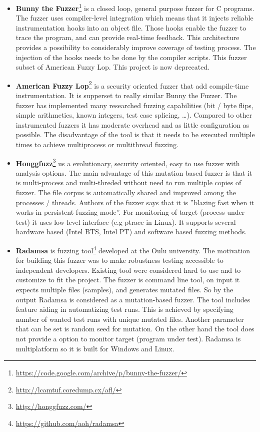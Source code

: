 \begin{itemize}

	\item \textbf{Bunny the Fuzzer}\footnote{\url{https://code.google.com/archive/p/bunny-the-fuzzer/}} is a closed loop, general purpose fuzzer for C programs.
	The fuzzer uses compiler-level integration which means that it injects reliable instrumentation hooks into an object file.
	Those hooks enable the fuzzer to trace the program, and can provide real-time feedback. This architecture provides a possibility
	to considerably improve coverage of testing process. The injection of the hooks
	needs to be done by the compiler scripts.
	This fuzzer  subset of American Fuzzy Lop. This project is now deprecated.

	\item \textbf{American Fuzzy Lop}\footnote{\url{http://lcamtuf.coredump.cx/afl/}}
	is a security oriented fuzzer that add compile-time instrumentation. It is
	supperset to really similar Bunny the Fuzzer. The fuzzer has implemented many
	researched fuzzing capabilities (bit / byte flips,  simple arithmetics, known
	integers, test case splicing, \ldots). Compared to other instrumented fuzzers it
	has moderate overhead and as little configuration as possible. The disadvantage
	of the tool is that it needs to be executed multiple times to achieve
	multiprocess or multithread fuzzing.

	\item \textbf{Honggfuzz}\footnote{\url{http://honggfuzz.com/}} us a evolutionary, security oriented, easy to use fuzzer with analysis options.
	The main advantage of this mutation based fuzzer is that it is multi-process and multi-threded without need to run multiple copies of fuzzer.
	The file corpus is automatically shared and improved among the processes / threads.
	Authors of the fuzzer says that it is ''blazing fast when it works in persistent fuzzing mode''.
	For monitoring of target (process under test) it uses low-level interface (e.g ptrace in Linux).
	It supports several hardware based (Intel BTS, Intel PT) and software based fuzzing methods.

	\item \textbf{Radamsa} is fuzzing tool\footnote{\url{https://github.com/aoh/radamsa}} developed at the Oulu university.
	The motivation for building this fuzzer was to make robustness testing accessible to independent developers.
	Existing tool were considered hard to use and to customize to fit the project.
	The fuzzer is command line tool, on input it expects multiple files (samples), and generates mutated files.
	So by the output Radamsa is considered as a mutation-based fuzzer.
	The tool includes feature aiding in automatizing test runs.
	This is achieved by specifying number of wanted test runs with unique mutated files.
	Another parameter that can be set is random seed for mutation.
	On the other hand the tool does not provide a option to monitor target (program under test).
	Radamsa is multiplatform so it is built for Windows and Linux.\cite{radamsaThesis}


\end{itemize}

